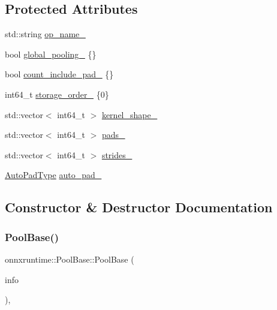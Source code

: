 \subsection*{Protected Attributes}
\begin{DoxyCompactItemize}
\item 
std\+::string \mbox{\hyperlink{classonnxruntime_1_1PoolBase_ac5d23d7b229dc2591f9c0d3c7f9aea47}{op\+\_\+name\+\_\+}}
\item 
bool \mbox{\hyperlink{classonnxruntime_1_1PoolBase_acac1af51d56763ea787e47aade8f32e0}{global\+\_\+pooling\+\_\+}} \{\}
\item 
bool \mbox{\hyperlink{classonnxruntime_1_1PoolBase_a05b454b7656653a2e62a48cc16db8cf2}{count\+\_\+include\+\_\+pad\+\_\+}} \{\}
\item 
int64\+\_\+t \mbox{\hyperlink{classonnxruntime_1_1PoolBase_a8c54de261d31ff7a10f2727759768906}{storage\+\_\+order\+\_\+}} \{0\}
\item 
std\+::vector$<$ int64\+\_\+t $>$ \mbox{\hyperlink{classonnxruntime_1_1PoolBase_ae5614fd2b239e5d9ce3701d4ec895eaa}{kernel\+\_\+shape\+\_\+}}
\item 
std\+::vector$<$ int64\+\_\+t $>$ \mbox{\hyperlink{classonnxruntime_1_1PoolBase_a97d82b98489070f0921c19b1811fdfab}{pads\+\_\+}}
\item 
std\+::vector$<$ int64\+\_\+t $>$ \mbox{\hyperlink{classonnxruntime_1_1PoolBase_a12246aa19006cba0dfb1fd125108bb91}{strides\+\_\+}}
\item 
\mbox{\hyperlink{namespaceonnxruntime_add1059a27d156d4ed3567a3a6852d94f}{Auto\+Pad\+Type}} \mbox{\hyperlink{classonnxruntime_1_1PoolBase_ab76a2f8a1212875d466684de7baa4a4b}{auto\+\_\+pad\+\_\+}}
\end{DoxyCompactItemize}


\subsection{Constructor \& Destructor Documentation}
\mbox{\label{classonnxruntime_1_1PoolBase_a5af935e3b9738fdb207395c9dae84c21}} 
\subsubsection{\texorpdfstring{Pool\+Base()}{PoolBase()}}
{\footnotesize\ttfamily onnxruntime\+::\+Pool\+Base\+::\+Pool\+Base (\begin{DoxyParamCaption}\item[{const \mbox{\hyperlink{classonnxruntime_1_1OpKernelInfo}{Op\+Kernel\+Info}} \&}]{info }\end{DoxyParamCaption})\hspace{0.3cm}{\ttfamily [inline]}, {\ttfamily [protected]}}

